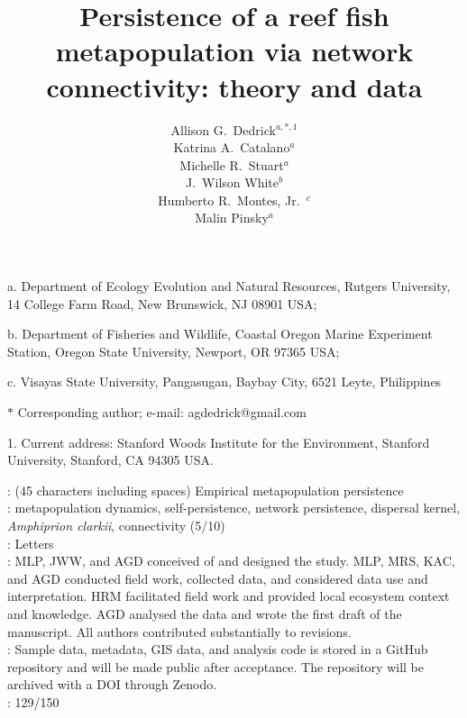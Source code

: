 \documentclass[12pt, oneside]{article}   	%
\author{}
\author{Allison G.\ Dedrick$^{a, \ast, 1}$ \\
Katrina A.\ Catalano$^a$ \\
Michelle R.\ Stuart$^a$ \\
J.\ Wilson White$^b$ \\
Humberto R.\ Montes, Jr.\ $^c$ \\
Malin Pinsky$^a$}
\title{Persistence of a reef fish metapopulation via network connectivity: theory and data}
\date{}
\begin{document}
\renewcommand{\topfraction}{0.95}
\maketitle{}

\noindent{} a. Department of Ecology Evolution and Natural Resources, Rutgers University, 14 College Farm Road, New Brunswick, NJ 08901 USA;

\noindent{} b. Department of Fisheries and Wildlife, Coastal Oregon Marine Experiment Station, Oregon State University, Newport, OR 97365 USA;

\noindent{} c. Visayas State University, Pangasugan, Baybay City, 6521 Leyte, Philippines

\noindent{} $\ast$ Corresponding author; e-mail: agdedrick@gmail.com

\noindent{} 1. Current address: Stanford Woods Institute for the Environment, Stanford University, Stanford, CA 94305 USA.


: (45 characters including spaces) Empirical metapopulation persistence \\

: metapopulation dynamics, self-persistence, network persistence, dispersal kernel, \textit{Amphiprion clarkii}, connectivity (5/10) \\ 

: Letters \\ 

: MLP, JWW, and AGD conceived of and designed the study. MLP, MRS, KAC, and AGD conducted field work, collected data, and considered data use and interpretation. HRM facilitated field work and provided local ecosystem context and knowledge. AGD analysed the data and wrote the first draft of the manuscript. All authors contributed substantially to revisions. \\ 

: Sample data, metadata, GIS data, and analysis code is stored in a GitHub repository and will be made public after acceptance. The repository will be archived with a DOI through Zenodo. \\

: 129/150\\ 
\end{document}
